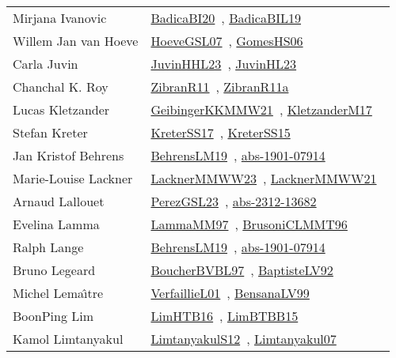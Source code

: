 {\begin{longtable}{p{4cm}p{20cm}}
Mirjana Ivanovic & \href{}{BadicaBI20}~\cite{BadicaBI20}, \href{papers/BadicaBIL19.pdf}{BadicaBIL19}~\cite{BadicaBIL19}\\
Willem Jan van Hoeve & \href{papers/HoeveGSL07.pdf}{HoeveGSL07}~\cite{HoeveGSL07}, \href{papers/GomesHS06.pdf}{GomesHS06}~\cite{GomesHS06}\\
Carla Juvin & \href{papers/JuvinHHL23.pdf}{JuvinHHL23}~\cite{JuvinHHL23}, \href{papers/JuvinHL23.pdf}{JuvinHL23}~\cite{JuvinHL23}\\
Chanchal K. Roy & \href{papers/ZibranR11.pdf}{ZibranR11}~\cite{ZibranR11}, \href{papers/ZibranR11a.pdf}{ZibranR11a}~\cite{ZibranR11a}\\
Lucas Kletzander & \href{papers/GeibingerKKMMW21.pdf}{GeibingerKKMMW21}~\cite{GeibingerKKMMW21}, \href{papers/KletzanderM17.pdf}{KletzanderM17}~\cite{KletzanderM17}\\
Stefan Kreter & \href{articles/KreterSS17.pdf}{KreterSS17}~\cite{KreterSS17}, \href{papers/KreterSS15.pdf}{KreterSS15}~\cite{KreterSS15}\\
Jan Kristof Behrens & \href{papers/BehrensLM19.pdf}{BehrensLM19}~\cite{BehrensLM19}, \href{articles/abs-1901-07914.pdf}{abs-1901-07914}~\cite{abs-1901-07914}\\
Marie{-}Louise Lackner & \href{articles/LacknerMMWW23.pdf}{LacknerMMWW23}~\cite{LacknerMMWW23}, \href{papers/LacknerMMWW21.pdf}{LacknerMMWW21}~\cite{LacknerMMWW21}\\
Arnaud Lallouet & \href{papers/PerezGSL23.pdf}{PerezGSL23}~\cite{PerezGSL23}, \href{articles/abs-2312-13682.pdf}{abs-2312-13682}~\cite{abs-2312-13682}\\
Evelina Lamma & \href{articles/LammaMM97.pdf}{LammaMM97}~\cite{LammaMM97}, \href{papers/BrusoniCLMMT96.pdf}{BrusoniCLMMT96}~\cite{BrusoniCLMMT96}\\
Ralph Lange & \href{papers/BehrensLM19.pdf}{BehrensLM19}~\cite{BehrensLM19}, \href{articles/abs-1901-07914.pdf}{abs-1901-07914}~\cite{abs-1901-07914}\\
Bruno Legeard & \href{}{BoucherBVBL97}~\cite{BoucherBVBL97}, \href{papers/BaptisteLV92.pdf}{BaptisteLV92}~\cite{BaptisteLV92}\\
Michel Lema{\^{\i}}tre & \href{papers/VerfaillieL01.pdf}{VerfaillieL01}~\cite{VerfaillieL01}, \href{articles/BensanaLV99.pdf}{BensanaLV99}~\cite{BensanaLV99}\\
BoonPing Lim & \href{papers/LimHTB16.pdf}{LimHTB16}~\cite{LimHTB16}, \href{papers/LimBTBB15.pdf}{LimBTBB15}~\cite{LimBTBB15}\\
Kamol Limtanyakul & \href{articles/LimtanyakulS12.pdf}{LimtanyakulS12}~\cite{LimtanyakulS12}, \href{papers/Limtanyakul07.pdf}{Limtanyakul07}~\cite{Limtanyakul07}\\

\end{longtable}}
